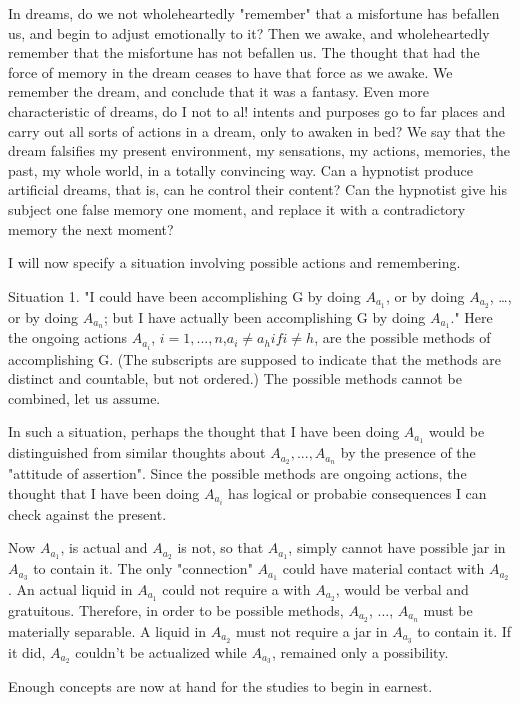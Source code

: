 \documentclass[10pt,twoside]{memoir}
\begin{document}
\begin{enumerate}
{\begin{enumerate}
\begin{sysrules}
\begin{sysrules}
\begin{sysrules}
\begin{sysrules}
In dreams, do we not wholeheartedly "remember" that a misfortune 
has befallen us, and begin to adjust emotionally to it? Then we awake, and 
wholeheartedly remember that the misfortune has not befallen us. The 
thought that had the force of memory in the dream ceases to have that force 
as we awake. We remember the dream, and conclude that it was a fantasy. 
Even more characteristic of dreams, do I not to al! intents and purposes go 
to far places and carry out all sorts of actions in a dream, only to awaken in 
bed? We say that the dream falsifies my present environment, my 
sensations, my actions, memories, the past, my whole world, in a totally 
convincing way. Can a hypnotist produce artificial dreams, that is, can he 
control their content? Can the hypnotist give his subject one false memory 
one moment, and replace it with a contradictory memory the next 
moment? 

I will now specify a situation involving possible actions and 
remembering. 

Situation 1. "I could have been accomplishing G by doing $A_{a_1}$, or by 
doing $A_{a_2}$, \ldots, or by doing $A_{a_n}$; but I have actually been accomplishing G by 
doing $A_{a_1}$." Here the ongoing actions $A_{a_i}$, $i=1,...,n$,$a_i\neq a_h if i\neq h$, are 
the possible methods of accomplishing G. (The subscripts are supposed to 
indicate that the methods are distinct and countable, but not ordered.) The 
possible methods cannot be combined, let us assume. 

In such a situation, perhaps the thought that I have been doing $A_{a_1}$
would be distinguished from similar thoughts about $A_{a_2}, ..., A_{a_n}$ by the
presence of the "attitude of assertion". Since the possible methods are 
ongoing actions, the thought that I have been doing $A_{a_i}$ has logical or 
probabie consequences I can check against the present. 

Now $A_{a_1}$, is actual and $A_{a_2}$ is not, so that $A_{a_1}$, simply cannot have 
possible jar in $A_{a_3}$ to contain it. The only "connection" $A_{a_1}$ could have
material contact with $A_{a_2}$. An actual liquid in $A_{a_1}$ could not require a 
with $A_{a_2}$, would be verbal and gratuitous. Therefore, in order to be possible 
methods, $A_{a_2}$, ..., $A_{a_n}$ must be materially separable. A liquid in $A_{a_2}$ must
not require a jar in $A_{a_3}$ to contain it. If it did, $A_{a_2}$ couldn't be actualized 
while $A_{a_3}$, remained only a possibility. 

Enough concepts are now at hand for the studies to begin in earnest. 


\end{sysrules}
\end{sysrules}
\end{sysrules}
\end{sysrules}
\end{enumerate}}
\end{enumerate}
\end{document}
